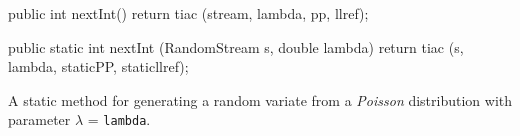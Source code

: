 \begin{hide} \begin{code}
    
   public int nextInt() {
      return tiac (stream, lambda, pp, llref);
   }

   public static int nextInt (RandomStream s, double lambda) {
      return tiac (s, lambda, staticPP, staticllref);
   }
\end{code}
\begin{tabb}  A static method for generating a random variate from a 
{\em Poisson\/} distribution with parameter $\lambda$ = \texttt{lambda}. 
\end{tabb}
\end{hide}
